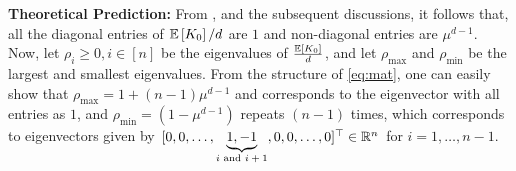 \textbf{Theoretical Prediction:} From , and the subsequent discussions, it follows that, all the diagonal entries of $\mathbb{E}\left[K_0\right]/d$ are $1$ and non-diagonal entries are $\mu^{d-1}$. Now, let $\rho_i\geq 0,i \in [n]$ be the eigenvalues of $\frac{\mathbb{E}\left[K_0\right]}{d}$, and let $\rho_{\max}$ and $\rho_{\min}$ be the largest and smallest eigenvalues. From the structure of \eqref{eq:mat}, one can easily show that $\rho_{\max}=1+(n-1)\mu^{d-1}$ and corresponds to the eigenvector with all entries as $1$, and $\rho_{\min}=(1-\mu^{d-1})$ repeats $(n-1)$ times, which corresponds to eigenvectors given by $[0, 0, \ldots, \underbrace{1, -1}_{\text{$i$ and $i+1$}}, 0,0,\ldots, 0]^\top \in \mathbb{R}^n$ for $i=1,\ldots,n-1$.

